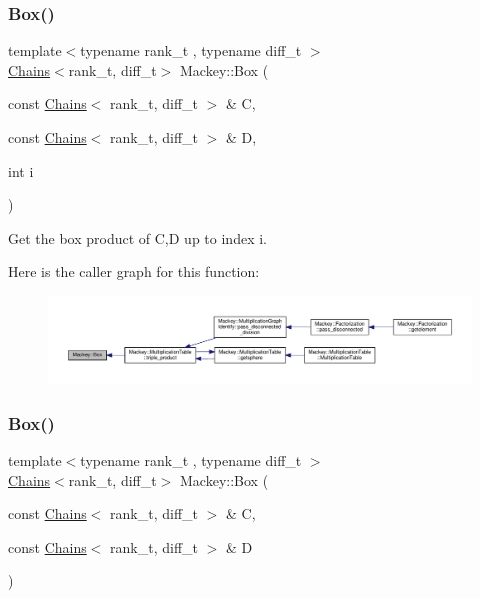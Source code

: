 \subsubsection{\texorpdfstring{Box()}{Box()}\hspace{0.1cm}{\footnotesize\ttfamily [1/2]}}
{\footnotesize\ttfamily template$<$typename rank\+\_\+t , typename diff\+\_\+t $>$ \\
\hyperlink{classMackey_1_1Chains}{Chains}$<$rank\+\_\+t, diff\+\_\+t$>$ Mackey\+::\+Box (\begin{DoxyParamCaption}\item[{const \hyperlink{classMackey_1_1Chains}{Chains}$<$ rank\+\_\+t, diff\+\_\+t $>$ \&}]{C,  }\item[{const \hyperlink{classMackey_1_1Chains}{Chains}$<$ rank\+\_\+t, diff\+\_\+t $>$ \&}]{D,  }\item[{int}]{i }\end{DoxyParamCaption})\hspace{0.3cm}{\ttfamily [inline]}}



Get the box product of C,D up to index i. 

Here is the caller graph for this function\+:\nopagebreak
\begin{figure}[H]
\begin{center}
\leavevmode
\includegraphics[width=350pt]{namespaceMackey_add5b60c8e734df2be261106e0c719f82_icgraph}
\end{center}
\end{figure}
\mbox{\label{namespaceMackey_a72abbe3708c4e77936c8cc42fbc6753a}} 
\subsubsection{\texorpdfstring{Box()}{Box()}\hspace{0.1cm}{\footnotesize\ttfamily [2/2]}}
{\footnotesize\ttfamily template$<$typename rank\+\_\+t , typename diff\+\_\+t $>$ \\
\hyperlink{classMackey_1_1Chains}{Chains}$<$rank\+\_\+t, diff\+\_\+t$>$ Mackey\+::\+Box (\begin{DoxyParamCaption}\item[{const \hyperlink{classMackey_1_1Chains}{Chains}$<$ rank\+\_\+t, diff\+\_\+t $>$ \&}]{C,  }\item[{const \hyperlink{classMackey_1_1Chains}{Chains}$<$ rank\+\_\+t, diff\+\_\+t $>$ \&}]{D }\end{DoxyParamCaption})\hspace{0.3cm}{\ttfamily [inline]}}



